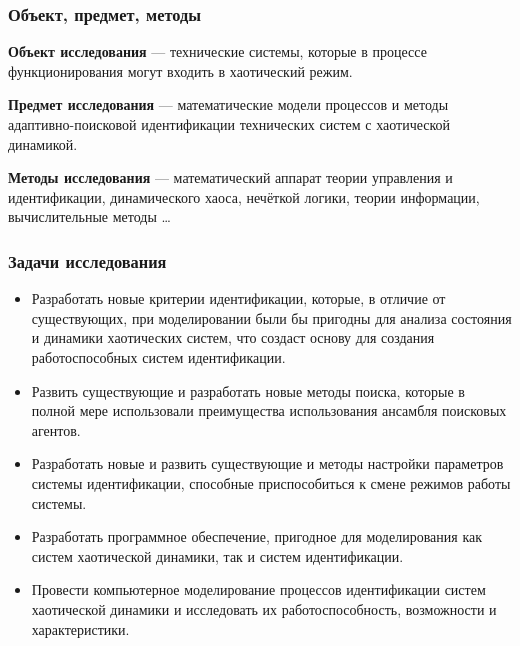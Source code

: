 \documentclass[10pt,utf8]{beamer}
\begin{document}
\begin{frame}
  \frametitle{Объект, предмет, методы}

\textbf{Объект исследования} ---
технические системы, которые в процессе функционирования
могут входить в хаотический режим.

\medskip

\textbf{Предмет исследования} ---
математические модели процессов и методы
адаптивно-поисковой идентификации технических систем с хаотической динамикой.

\medskip

\textbf{Методы исследования} ---
математический аппарат теории управления и идентификации,
динамического хаоса,
нечёткой логики,
теории информации,
вычислительные методы
\ldots

\end{frame}




\begin{frame}
  \frametitle{Задачи исследования}

  \begin{itemize}

    \item
      Разработать новые критерии идентификации, которые, в отличие от существующих,
      при моделировании были бы пригодны для анализа состояния и динамики хаотических
      систем, что создаст основу для создания работоспособных систем идентификации.

    \item
      Развить существующие и разработать новые методы поиска, которые в полной мере
      использовали преимущества использования ансамбля поисковых агентов.

    \item
      Разработать новые и развить существующие и  методы настройки параметров системы
      идентификации, способные приспособиться к смене режимов работы системы.

    \item
      Разработать программное обеспечение, пригодное для моделирования как систем
      хаотической динамики, так и систем идентификации.

    \item
      Провести компьютерное моделирование процессов идентификации систем хаотической
      динамики и исследовать их работоспособность, возможности и характеристики.

  \end{itemize}

\end{frame}
\end{document}
